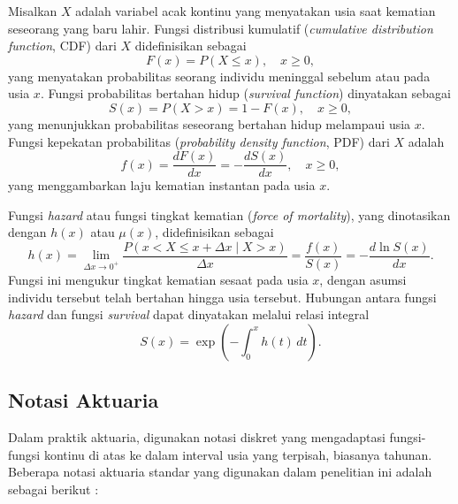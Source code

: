 Misalkan $X$ adalah variabel acak kontinu yang menyatakan usia saat kematian seseorang yang baru lahir. Fungsi distribusi kumulatif (\textit{cumulative distribution function}, CDF) dari $X$ didefinisikan sebagai
\begin{equation}
    F(x) = P(X \leq x), \quad x \geq 0,
\end{equation}
yang menyatakan probabilitas seorang individu meninggal sebelum atau pada usia $x$. Fungsi probabilitas bertahan hidup (\textit{survival function}) dinyatakan sebagai
\begin{equation}
    S(x) = P(X > x) = 1 - F(x), \quad x \geq 0,
\end{equation}
yang menunjukkan probabilitas seseorang bertahan hidup melampaui usia $x$. Fungsi kepekatan probabilitas (\textit{probability density function}, PDF) dari $X$ adalah
\begin{equation}
    f(x) = \frac{dF(x)}{dx} = -\frac{dS(x)}{dx}, \quad x \geq 0,
\end{equation}
yang menggambarkan laju kematian instantan pada usia $x$.

Fungsi \textit{hazard} atau fungsi tingkat kematian (\textit{force of mortality}), yang dinotasikan dengan $h(x)$ atau $\mu(x)$, didefinisikan sebagai
\begin{equation}
    h(x) = \lim_{\Delta x \to 0^+} \frac{P(x < X \leq x + \Delta x \mid X > x)}{\Delta x} = \frac{f(x)}{S(x)} = -\frac{d \ln S(x)}{dx}.
\end{equation}
Fungsi ini mengukur tingkat kematian sesaat pada usia $x$, dengan asumsi individu tersebut telah bertahan hingga usia tersebut. Hubungan antara fungsi \textit{hazard} dan fungsi \textit{survival} dapat dinyatakan melalui relasi integral
\begin{equation}
    S(x) = \exp\left(-\int_0^x h(t) \, dt\right).
\end{equation}

\subsection{Notasi Aktuaria}

Dalam praktik aktuaria, digunakan notasi diskret yang mengadaptasi fungsi-fungsi kontinu di atas ke dalam interval usia yang terpisah, biasanya tahunan. Beberapa notasi aktuaria standar yang digunakan dalam penelitian ini adalah sebagai berikut \citep{dickson2020actuarial}:


